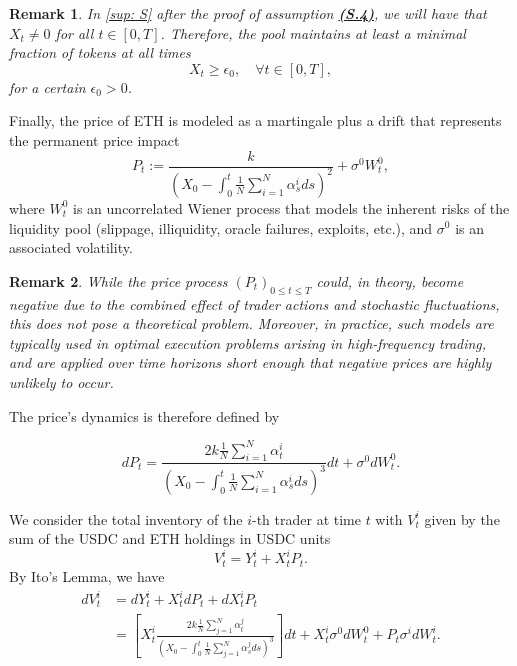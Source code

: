 \documentclass[11pt]{article}
\newtheorem*{remark*}{Remark}
\theoremstyle{definition}
\begin{document}
\begin{remark*}
    In \ref{sup: S} after the proof of assumption \textbf{\hyperref[sup: S.4]{(S.4)}}, we will have that $X_t \neq 0$ for all $t \in [0,T]$. Therefore, the pool maintains at least a minimal fraction of tokens at all times
\begin{equation}\label{Xpositive}
    X_t \geq \epsilon_0, \quad \forall t\in[0,T], 
\end{equation}
for a certain $\epsilon_0>0$.
\end{remark*}

Finally, the price of ETH is modeled as a martingale plus a drift that represents the permanent price impact
$$ P_t := \frac{k}{\displaystyle \left(X_0 - \int_0^t \frac{1}{N} \sum_{i=1}^N \alpha_s^i ds \right)^2} + \sigma^0 W_t^0, $$
where $W_t^0$ is an uncorrelated Wiener process that models the inherent risks of the liquidity pool (slippage, illiquidity, oracle failures, exploits, etc.), and $\sigma^0$ is an associated volatility.

\begin{remark*}
    While the price process $(P_t)_{0\leq t\leq T}$ could, in theory, become negative due to the combined effect of trader actions and stochastic fluctuations, this does not pose a theoretical problem. Moreover, in practice, such models are typically used in optimal execution problems arising in high-frequency trading, and are applied over time horizons short enough that negative prices are highly unlikely to occur.
\end{remark*}

The price's dynamics is therefore defined by

$$ dP_t = \frac{2k\displaystyle \frac{1}{N} \sum_{i=1}^N \alpha_t^i}{\displaystyle\left(X_0 - \int_0^t \frac{1}{N} \sum_{i=1}^N \alpha_s^i ds \right)^3} dt+ \sigma^0 dW_t^0. $$

We consider the total inventory of the $i$-th trader at time $t$ with $V_t^i$ given by the sum of the USDC and ETH holdings in USDC units
$$ V_t^i = Y_t^i + X_t^i P_t. $$
By Ito's Lemma, we have
\begin{equation}
\label{Ito_inventory}
  \begin{aligned}
dV_t^i &= dY_t^i + X_t^i dP_t + dX_t^i P_t \\
&= \left[ X_t^i \frac{2k\displaystyle \frac{1}{N} \sum_{j=1}^{N} \alpha_t^j}{\displaystyle\left(X_0 - \int_0^t \frac{1}{N} \sum_{j=1}^N \alpha_s^j ds \right)^3} \right] dt + X_t^i \sigma^0 dW_t^0 + P_t \sigma^i dW_t^i.
\end{aligned}
\end{equation}
\end{document}

